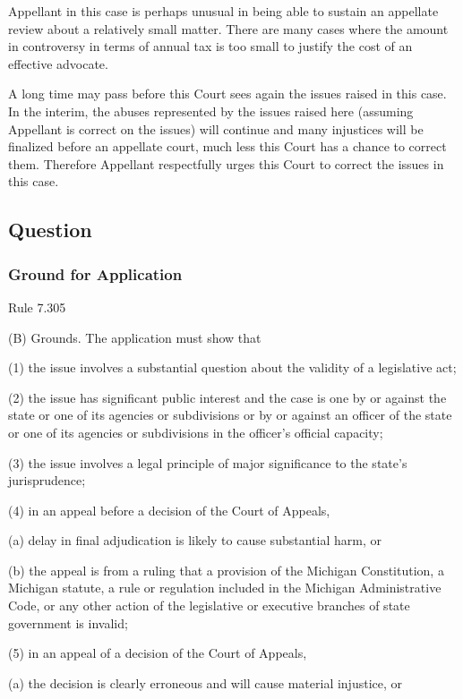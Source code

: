 \documentclass[12pt,\documentclassflag]{michiganCourtOfAppealsBrief}
\begin{document}
Appellant in this case is perhaps unusual in being able to sustain an appellate review about a relatively small matter. There are many cases where the amount in controversy in terms of annual tax is too small to justify the cost of an effective advocate. 

A long time may pass before this Court sees again the issues raised in this case. In the interim, the abuses represented by the issues raised here (assuming Appellant is correct on the issues) will continue and many injustices will be finalized before an appellate court, much less this Court has a chance to correct them. Therefore Appellant respectfully urges this Court to correct the issues in this case.



\subsection{Question}
\subsubsection{Ground for Application}

Rule 7.305

(B)   Grounds. The application must show that

(1)   the issue involves a substantial question about the validity of a legislative act;

(2)   the issue has significant public interest and the case is one by or against the state or one of its agencies or subdivisions or by or against an officer of the state or one of its agencies or subdivisions in the officer's official capacity;

(3)   the issue involves a legal principle of major significance to the state's jurisprudence;

(4)   in an appeal before a decision of the Court of Appeals,

(a)   delay in final adjudication is likely to cause substantial harm, or

(b)   the appeal is from a ruling that a provision of the Michigan Constitution, a Michigan statute, a rule or regulation included in the Michigan Administrative Code, or any other action of the legislative or executive branches of state government is invalid;

(5)   in an appeal of a decision of the Court of Appeals,

(a)   the decision is clearly erroneous and will cause material injustice, or
\end{document}
